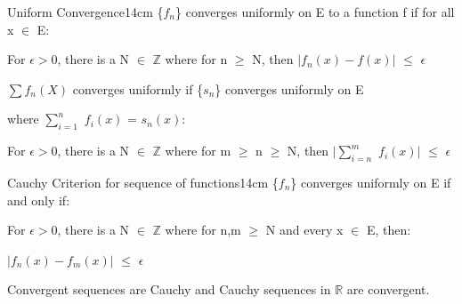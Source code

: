     \begin{definition}{Uniform Convergence}{14cm}
        \{$f_n$\} converges uniformly on E to a function f if for all x $\in$ E:
        
        \hspace{0.5cm}
        For $\epsilon > 0$, there is a N $\in$ $\mathbb{Z}$ where for n $\geq$ N, then
        $|f_n(x) - f(x)|$ $\leq$ $\epsilon$

        \vspace{0.3cm}

        $\sum f_n(X)$ converges uniformly if \{$s_n$\} converges uniformly on E
        
        where $\sum_{i=1}^n$ $f_i(x)$ = $s_n(x)$:

        \hspace{0.5cm}
        For $\epsilon > 0$, there is a N $\in$ $\mathbb{Z}$ where for
        m $\geq$ n $\geq$ N, then
        $|\sum_{i=n}^m$ $f_i(x)|$
        $\leq$ $\epsilon$        
    \end{definition}

    \vspace{0.5cm}



    \begin{wtheorem}{Cauchy Criterion for sequence of functions}{14cm}
        \{$f_n$\} converges uniformly on E if and only if:
        
        \hspace{0.5cm}
        For $\epsilon > 0$, there is a N $\in$ $\mathbb{Z}$ where for n,m $\geq$ N
        and every x $\in$ E, then:
        
        \hspace{1cm}
        $|f_n(x) - f_m(x)|$ $\leq$ $\epsilon$        
    \end{wtheorem}


    \begin{intuition}
        Convergent sequences are Cauchy
        and Cauchy sequences in $\mathbb{R}$ are convergent.
    \end{intuition}

    \vspace{0.1cm}

